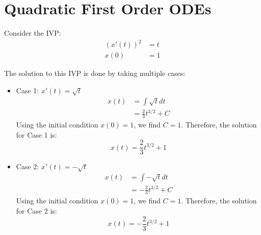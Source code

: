 \documentclass[12pt, oneside]{book}
\begin{document}
\section{Quadratic First Order ODEs}
Consider the IVP:
\begin{align*}
	(x'(t))^2 &= t \\
	x(0) &= 1
\end{align*}

The solution to this IVP is done by taking multiple cases:
\begin{itemize}
	\item Case 1: \(x'(t) = \sqrt{t}\)
	\begin{align*}
		x(t) &= \int \sqrt{t} dt \\
		&= \frac{2}{3} t^{3/2} + C
	\end{align*}
	Using the initial condition \(x(0) = 1\), we find \(C = 1\). Therefore, the solution for Case 1 is:
	\begin{equation}
		x(t) = \frac{2}{3} t^{3/2} + 1
	\end{equation}
	\item Case 2: \(x'(t) = -\sqrt{t}\)
	\begin{align*}
		x(t) &= \int -\sqrt{t} dt \\
		&= -\frac{2}{3} t^{3/2} + C
	\end{align*}
	Using the initial condition \(x(0) = 1\), we find \(C = 1\). Therefore, the solution for Case 2 is:
	\begin{equation}
		x(t) = -\frac{2}{3} t^{3/2} + 1
	\end{equation}
\end{itemize}
\end{document}

